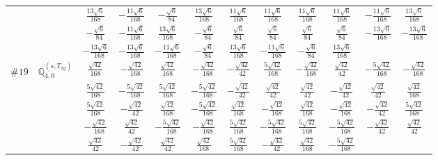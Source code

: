 \documentclass[fleqn,9pt,landscape]{jsarticle}
\begin{document}
\begin{center}
\begin{longtable}{lcccccccccc}
& $ \frac{13 \sqrt{6}}{168} $ & $ - \frac{11 \sqrt{6}}{168} $ & $ - \frac{\sqrt{6}}{84} $ & $ \frac{13 \sqrt{6}}{168} $ & $ \frac{11 \sqrt{6}}{168} $ & $ \frac{11 \sqrt{6}}{168} $ & $ \frac{11 \sqrt{6}}{168} $ & $ \frac{11 \sqrt{6}}{168} $ & $ - \frac{11 \sqrt{6}}{168} $ & $ \frac{13 \sqrt{6}}{168} $ \\
& $ - \frac{\sqrt{6}}{84} $ & $ - \frac{11 \sqrt{6}}{168} $ & $ \frac{13 \sqrt{6}}{168} $ & $ - \frac{\sqrt{6}}{84} $ & $ \frac{\sqrt{6}}{84} $ & $ \frac{\sqrt{6}}{84} $ & $ \frac{\sqrt{6}}{84} $ & $ \frac{\sqrt{6}}{84} $ & $ - \frac{13 \sqrt{6}}{168} $ & $ - \frac{13 \sqrt{6}}{168} $ \\
& $ - \frac{13 \sqrt{6}}{168} $ & $ - \frac{13 \sqrt{6}}{168} $ & $ - \frac{11 \sqrt{6}}{168} $ & $ - \frac{\sqrt{6}}{84} $ & $ \frac{13 \sqrt{6}}{168} $ & $ - \frac{11 \sqrt{6}}{168} $ & $ - \frac{\sqrt{6}}{84} $ & $ \frac{13 \sqrt{6}}{168} $ & $  $ & $  $ \\ \hline
$ \#19\quad \mathbb{Q}_{4,0}^{(s,T_{1g})} $ & $ \frac{\sqrt{42}}{168} $ & $ - \frac{\sqrt{42}}{168} $ & $ \frac{\sqrt{42}}{168} $ & $ - \frac{\sqrt{42}}{168} $ & $ - \frac{\sqrt{42}}{42} $ & $ \frac{5 \sqrt{42}}{168} $ & $ - \frac{\sqrt{42}}{168} $ & $ \frac{\sqrt{42}}{42} $ & $ - \frac{5 \sqrt{42}}{168} $ & $ - \frac{\sqrt{42}}{168} $ \\
& $ \frac{5 \sqrt{42}}{168} $ & $ - \frac{5 \sqrt{42}}{168} $ & $ \frac{5 \sqrt{42}}{168} $ & $ - \frac{5 \sqrt{42}}{168} $ & $ - \frac{\sqrt{42}}{42} $ & $ \frac{\sqrt{42}}{42} $ & $ \frac{\sqrt{42}}{42} $ & $ - \frac{\sqrt{42}}{42} $ & $ \frac{\sqrt{42}}{42} $ & $ \frac{\sqrt{42}}{168} $ \\
& $ \frac{5 \sqrt{42}}{168} $ & $ - \frac{\sqrt{42}}{42} $ & $ \frac{\sqrt{42}}{168} $ & $ - \frac{5 \sqrt{42}}{168} $ & $ \frac{\sqrt{42}}{168} $ & $ - \frac{\sqrt{42}}{168} $ & $ \frac{\sqrt{42}}{168} $ & $ - \frac{\sqrt{42}}{168} $ & $ - \frac{\sqrt{42}}{42} $ & $ \frac{5 \sqrt{42}}{168} $ \\
& $ - \frac{\sqrt{42}}{168} $ & $ \frac{\sqrt{42}}{42} $ & $ - \frac{5 \sqrt{42}}{168} $ & $ - \frac{\sqrt{42}}{168} $ & $ \frac{5 \sqrt{42}}{168} $ & $ - \frac{5 \sqrt{42}}{168} $ & $ \frac{5 \sqrt{42}}{168} $ & $ - \frac{5 \sqrt{42}}{168} $ & $ - \frac{\sqrt{42}}{42} $ & $ \frac{\sqrt{42}}{42} $ \\
& $ \frac{\sqrt{42}}{42} $ & $ - \frac{\sqrt{42}}{42} $ & $ \frac{\sqrt{42}}{42} $ & $ \frac{\sqrt{42}}{168} $ & $ \frac{5 \sqrt{42}}{168} $ & $ - \frac{\sqrt{42}}{42} $ & $ \frac{\sqrt{42}}{168} $ & $ - \frac{5 \sqrt{42}}{168} $ & $  $ & $  $ \\ \hline

\end{longtable}
\end{center}
\end{document}
